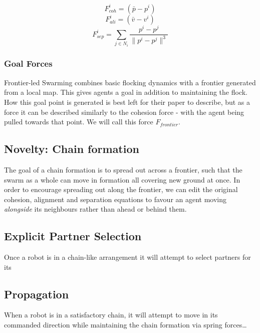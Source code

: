 \documentclass[runningheads]{llncs}
\begin{document}
\begin{multicols}{2}
    \begin{equation}
        F^i_{coh} = (\bar{p} - p^i) \label{eq:cohesion}
    \end{equation}
    \begin{equation}
        F^i_{ali} = (\bar{v} - v^i) \label{eq:alignment}
    \end{equation}
    \break
    \begin{equation}
        F^i_{sep} = \sum_{j \in N_i} \frac{p^i - p^j}{\|p^i - p^j\|^3}
        \label{eq:separation}
    \end{equation}
\end{multicols}

\subsubsection{Goal Forces}
Frontier-led Swarming\cite{tran2022} combines basic flocking dynamics with a frontier generated from a local map. This gives agents a goal in addition to maintaining the flock. How this goal point is generated is best left for their paper to describe, but as a force it can be described similarly to the cohesion force - with the agent being pulled towards that point. We will call this force $F_{frontier}$.

\subsection{Novelty: Chain formation}
The goal of a chain formation is to spread out across a frontier, such that the swarm as a whole can move in formation all covering new ground at once. In order to encourage spreading out along the frontier, we can edit the original cohesion, alignment and separation equations to favour an agent moving \textit{alongside} its neighbours rather than ahead or behind them.

\subsection{Explicit Partner Selection}
Once a robot is in a chain-like arrangement it will attempt to select partners for its 

\subsection{Propagation}
When a robot is in a satisfactory chain, it will attempt to move in its commanded direction while maintaining the chain formation via spring forces\dots
\end{document}
